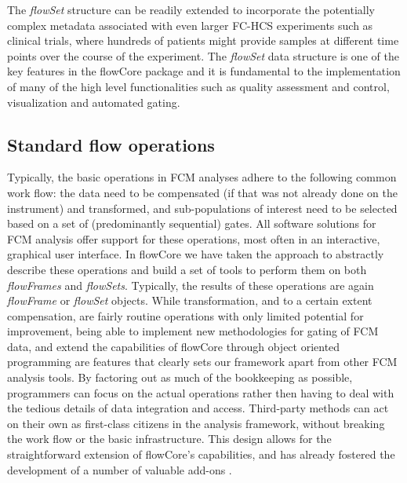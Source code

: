 \documentclass[10pt]{bmc_article}
\newcommand{\Rpackage}[1]{{\textsf{#1}}}
\newcommand{\Rclass}[1]{{\textit{#1}}}
\newenvironment{bmcformat}{\begin{raggedright}\baselineskip20pt\sloppy\setboolean{publ}{false}}{\end{raggedright}\baselineskip20pt\sloppy}
\begin{document}
\begin{bmcformat}
The \Rclass{flowSet} structure can be readily extended to incorporate
the potentially complex metadata associated with even larger FC-HCS
experiments such as clinical trials, where hundreds of patients might
provide samples at different time points over the course of the
experiment. The \Rclass{flowSet} data structure is one of the key
features in the \Rpackage{flowCore} package and it is fundamental to
the implementation of many of the high level functionalities such as
quality assessment and control, visualization and automated gating.

\subsection*{Standard flow operations}
Typically, the basic operations in FCM analyses adhere to the
following common work flow: the data need to be compensated (if that
was not already done on the instrument) and transformed, and
sub-populations of interest need to be selected based on a set of
(predominantly sequential) gates. All software solutions for FCM
analysis offer support for these operations, most often in an
interactive, graphical user interface. In \Rpackage{flowCore} we have
taken the approach to abstractly describe these operations and build a
set of tools to perform them on both \Rclass{flowFrames} and
\Rclass{flowSets}. Typically, the results of these operations are
again \Rclass{flowFrame} or \Rclass{flowSet} objects. While
transformation, and to a certain extent compensation, are fairly
routine operations with only limited potential for improvement, being
able to implement new methodologies for gating of FCM data, and extend
the capabilities of \Rpackage{flowCore} through object oriented
programming are features that clearly sets our framework apart from
other FCM analysis tools. By factoring out as much of the bookkeeping
as possible, programmers can focus on the actual operations rather
then having to deal with the tedious details of data integration and
access. Third-party methods can act on their own as first-class
citizens in the analysis framework, without breaking the work flow or
the basic infrastructure. This design allows for the straightforward
extension of \Rpackage{flowCore}'s capabilities, and has already
fostered the development of a number of valuable add-ons
\cite{lo2008agf,sarkar2008ufv}.


\end{bmcformat}
\end{document}
